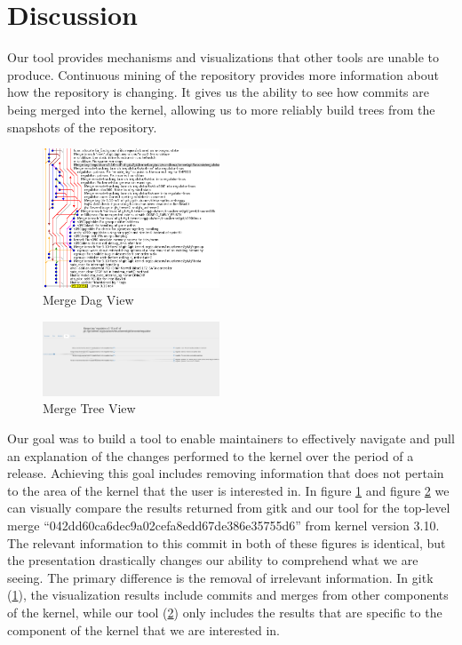 \documentclass[conference, draftclsnofoot, draft]{IEEEtran}
\begin{document}
\section{Discussion}

Our tool provides mechanisms and visualizations that other tools are unable to
produce. Continuous mining of the repository provides more information about how the
repository is changing. It gives us the ability to see how commits are being merged
into the kernel, allowing us to more reliably build trees from the snapshots of the
repository.

\begin{figure}
        \centering
        \includegraphics[width=0.47\textwidth]{figures/042dd_DAG.png}
        \caption{Merge Dag View}
        \label{fig:dag_view}
\end{figure}

\begin{figure}
        \centering
        \includegraphics[width=0.47\textwidth]{figures/042dd_tree.png}
        \caption{Merge Tree View}
        \label{fig:tree_view}
\end{figure}

Our goal was to build a tool to enable maintainers to effectively navigate and pull
an explanation of the changes performed to the kernel over the period of a release.
Achieving this goal includes removing information that does not pertain to the area
of the kernel that the user is interested in. In figure \ref{fig:dag_view} and
figure \ref{fig:tree_view} we can visually compare the results returned from gitk
and our tool for the top-level merge ``042dd60ca6dec9a02cefa8edd67de386e35755d6''
from kernel version 3.10. The relevant information to this commit in both of these
figures is identical, but the presentation drastically changes our ability to
comprehend what we are seeing. The primary difference is the removal of irrelevant
information. In gitk (\ref{fig:dag_view}), the visualization results include commits
and merges from other components of the kernel, while our tool (\ref{fig:tree_view})
only includes the results that are specific to the component of the kernel that we
are interested in.
\end{document}
